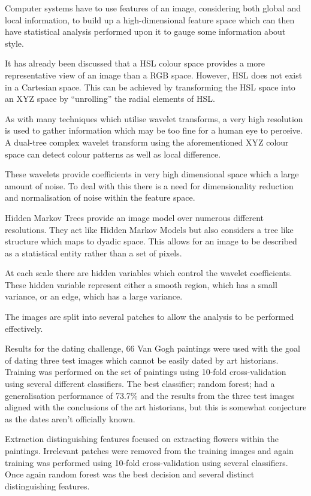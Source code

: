 \documentclass[conference]{IEEEtran}
\begin{document}
Computer systems have to use features of an image, considering both global and
local information, to build up a high-dimensional feature space which can then
have statistical analysis performed upon it to gauge some information about
style.

It has already been discussed that a \gls{HSL} colour space provides a more
representative view of an image than a \gls{RGB} space. However, \gls{HSL} does
not exist in a Cartesian space. This can be achieved by transforming the
\gls{HSL} space into an XYZ space by ``unrolling'' the radial elements of
\gls{HSL}. 

As with many techniques which utilise wavelet transforms, a very high
resolution is used to gather information which may be too fine for a human eye
to perceive. A dual-tree complex wavelet transform using the aforementioned XYZ
colour space can detect colour patterns as well as local difference.

These wavelets provide coefficients in very high dimensional space which a
large amount of noise. To deal with this there is a need for dimensionality
reduction and normalisation of noise within the feature space.

Hidden Markov Trees provide an image model over numerous different resolutions.
They act like Hidden Markov Models but also considers a tree like structure
which maps to dyadic space. This allows for an image to be described as a
statistical entity rather than a set of pixels.

At each scale there are hidden variables which control the wavelet
coefficients. These hidden variable represent either a smooth region, which has
a small variance, or an edge, which has a large variance.

The images are split into several patches to allow the analysis to be performed
effectively.

Results for the dating challenge, 66 Van Gogh paintings were used with the goal
of dating three test images which cannot be easily dated by art historians.
Training was performed on the set of paintings using 10-fold cross-validation
using several different classifiers. The best classifier; random forest; had a
generalisation performance of 73.7\% and the results from the three test images
aligned with the conclusions of the art historians, but this is somewhat
conjecture as the dates aren't officially known.

Extraction distinguishing features focused on extracting flowers within the
paintings. Irrelevant patches were removed from the training images and again
training was performed using 10-fold cross-validation using several
classifiers. Once again random forest was the best decision and several
distinct distinguishing features.
\end{document}
